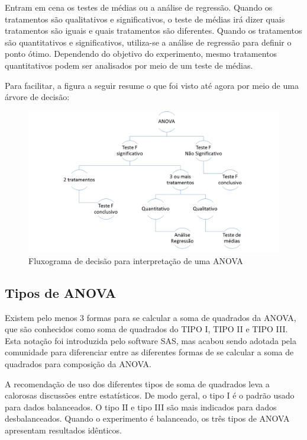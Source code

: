 \documentclass[
]{article}
\begin{document}
Entram em cena os testes de médias ou a análise de regressão. Quando os tratamentos são qualitativos e significativos, o teste de médias irá dizer quais tratamentos são iguais e quais tratamentos são diferentes. Quando os tratamentos são quantitativos e significativos, utiliza-se a análise de regressão para definir o ponto ótimo. Dependendo do objetivo do experimento, mesmo tratamentos quantitativos podem ser analisados por meio de um teste de médias.

Para facilitar, a figura a seguir resume o que foi visto até agora por meio de uma árvore de decisão:

\begin{figure}
\centering
\includegraphics{./figuras/resumo_anova.png}
\caption{Fluxograma de decisão para interpretação de uma ANOVA}
\end{figure}

\hypertarget{tipos-de-anova}{%
\subsection{Tipos de ANOVA}\label{tipos-de-anova}}

Existem pelo menos 3 formas para se calcular a soma de quadrados da ANOVA, que são conhecidos como soma de quadrados do TIPO I, TIPO II e TIPO III. Esta notação foi introduzida pelo software SAS, mas acabou sendo adotada pela comunidade para diferenciar entre as diferentes formas de se calcular a soma de quadrados para composição da ANOVA.

A recomendação de uso dos diferentes tipos de soma de quadrados leva a calorosas discussões entre estatísticos. De modo geral, o tipo I é o padrão usado para dados balanceados. O tipo II e tipo III são mais indicados para dados desbalanceados. Quando o experimento é balanceado, os três tipos de ANOVA apresentam resultados idênticos.
\end{document}
